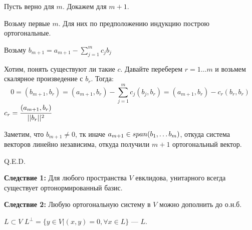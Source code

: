 Пусть верно для $m$. Докажем для $m+1$.

Возьму первые $m$. Для них по предположению индукцию построю ортогональные.

Возьму $b_{m+1}=a_{m+1} - \sum\limits_{j=1}^m c_j b_j$

Хотим, понять существуют ли такие $c$. Давайте переберем $r = 1\ldots m $ и возьмем скалярное произведение с $b_r$. Тогда:
$$0 = (b_{m+1}, b_r) = (a_{m+1},b_r)-\sum\limits_{j=1}^m c_j(b_j,b_r) = (a_{m+1},b_r)-c_r(b_r,b_r)$$
$c_r = \cfrac{(a_{m+1}, b_r)}{||b_r||^2}$

Заметим, что $b_{m+1}\neq 0$, тк иначе $a_{m+1}\in span(b_1,\ldots b_m)$, откуда система векторов линейно независима, откуда получили $m + 1$ ортогональный вектор.

\hfill Q.E.D.

\textbf{Следствие 1:} Для любого пространства $V$ евклидова, унитарного всегда существует ортонормированный базис.

\textbf{Следствие 2:} Любую ортогональную систему в $V$ можно дополнить до о.н.б.

 $L \subset V$ $L^{\perp} = \{y \in V | (x,y)=0, \forall x \in L\}$
---  $L$.


